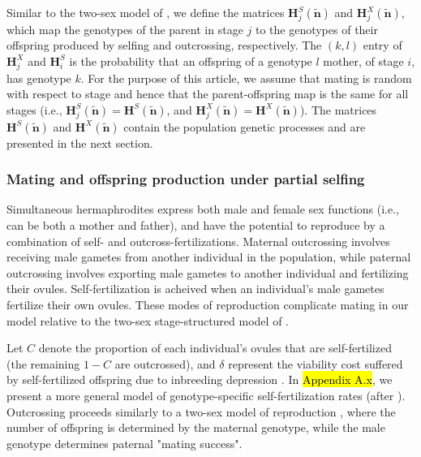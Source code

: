 \documentclass[11pt]{article}
\def\mbf#1{\mathbf{#1}}
\begin{document}
Similar to the two-sex model of \citet{deVriesCaswell2019b}, we define the matrices $\mbf{H}^S_{j}(\tilde{\mbf{n}})$ and $\mbf{H}^X_{j}(\tilde{\mbf{n}})$, which map the genotypes of the parent in stage $j$ to the genotypes of their offspring produced by selfing and outcrossing, respectively. The $(k, l)$ entry of $\mbf{H}^{X}_{j}$ and $\mbf{H}^{S}_{i}$ is the probability that an offspring of a genotype $l$ mother, of stage $i$, has genotype $k$. For the purpose of this article, we assume that mating is random with respect to stage and hence that the parent-offspring map is the same for all stages (i.e., $\mbf{H}^S_{j}(\tilde{\mbf{n}}) = \mbf{H}^S(\tilde{\mbf{n}})$, and $\mbf{H}^X_{j}(\tilde{\mbf{n}}) = \mbf{H}^X(\tilde{\mbf{n}})$). The matrices $\mbf{H}^S(\tilde{\mbf{n}})$ and $\mbf{H}^X(\tilde{\mbf{n}})$ contain the population genetic processes and are presented in the next section.

\subsubsection*{Mating and offspring production under partial selfing}

Simultaneous hermaphrodites express both male and female sex functions (i.e., can be both a mother and father), and have the potential to reproduce by a combination of self- and outcross-fertilizations. Maternal outcrossing involves receiving male gametes from another individual in the population, while paternal outcrossing involves exporting male gametes to another individual and fertilizing their ovules. Self-fertilization is acheived when an individual's male gametes fertilize their own ovules. These modes of reproduction complicate mating in our model relative to the two-sex stage-structured model of \citet{deVriesCaswell2019b}.

Let $C$ denote the proportion of each individual's ovules that are self-fertilized (the remaining $1 - C$ are outcrossed), and $\delta$ represent the viability cost suffered by self-fertilized offspring due to inbreeding depression \citep{Charlesworth1987}. In \hl{Appendix A.x}, we present a more general model of genotype-specific self-fertilization rates (after \citealt{JordanConnallon2014}). Outcrossing proceeds similarly to a two-sex model of reproduction \citep{deVriesCaswell2019b}, where the number of offspring is determined by the maternal genotype, while the male genotype determines paternal "mating success". 

\end{document}
